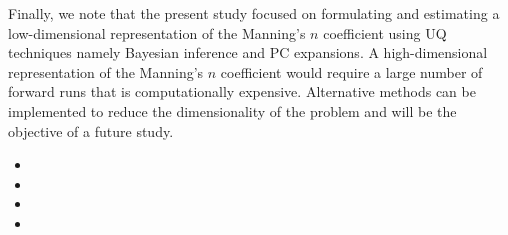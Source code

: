 


 
Finally, we note that the present study focused on formulating and estimating a
low-dimensional representation of the Manning's $n$ coefficient using UQ
techniques namely Bayesian inference and PC expansions.  A high-dimensional
representation of the Manning's $n$ coefficient would require a large number of
forward runs that is computationally expensive.  Alternative methods can be
implemented to reduce the dimensionality of the problem and will be the
objective of a future study.

 \begin{itemize}
 \item {}
 \item {}
 \item {}
 \item {}
 \end{itemize}
